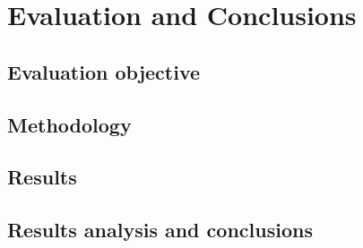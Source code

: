 \chapter*{Evaluation and Conclusions}
\label{cap:conclusions}

\section*{Evaluation objective}

\section*{Methodology}

\section*{Results}

\section*{Results analysis and conclusions}
